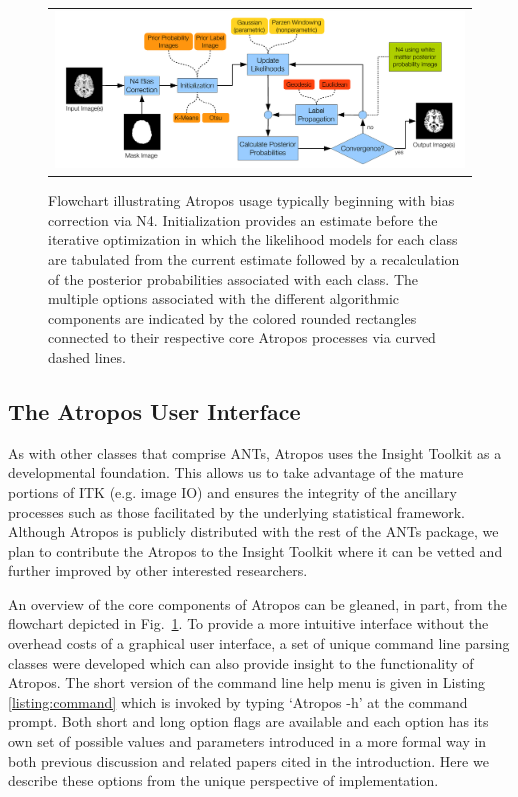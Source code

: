 \documentclass[11pt,english]{article}
\begin{document}
\begin{figure}
\begin{center}
\begin{tabular}{c}
\includegraphics[width=160mm]{AtroposFlowchart.pdf}
\end{tabular}
\caption{\baselineskip 12pt \small Flowchart illustrating Atropos usage typically beginning with bias correction via N4.  
Initialization provides an estimate before the iterative optimization in which the 
likelihood models for each class are tabulated from the current estimate followed by a recalculation of the 
posterior probabilities associated with each class.  The multiple options associated with the different algorithmic 
components are indicated by the colored rounded rectangles connected to their respective core Atropos 
processes via curved dashed lines.  }
\label{fig:flowchart}
\end{center}
\end{figure}
\subsection{The Atropos User Interface}
As with other classes that comprise ANTs, Atropos uses the Insight
Toolkit as a developmental foundation.  This allows us to take
advantage of the mature portions of ITK (e.g. image IO) and ensures
the integrity of the ancillary processes such as those facilitated by
the underlying statistical framework.  Although Atropos is publicly
distributed with the rest of the ANTs package, we plan to contribute
the Atropos to the Insight Toolkit where it can be vetted and further
improved by other interested researchers.

An overview of the core components of Atropos can be gleaned, in part, from the flowchart depicted in 
Fig.~\ref{fig:flowchart}.  To provide a more intuitive interface without the overhead costs of a graphical user interface, a set of unique command line parsing classes were developed which can also provide insight to the functionality of Atropos.  
The short version of the command line help menu is given in Listing \ref{listing:command} which is invoked by typing `{\ttfamily Atropos -h}' at the command prompt.  Both short and long option flags are available and each option has its own set of possible values and parameters introduced in a more formal way in both previous discussion and related papers cited in the introduction.  Here we  describe these options from the unique perspective of  implementation.
\end{document}

